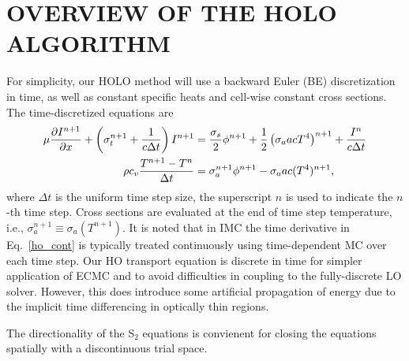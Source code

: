 
\chapter{\uppercase {Overview of the HOLO Algorithm}}
\label{chp:holo}

For simplicity, our HOLO method will use a backward Euler (BE) discretization in time, as
well as constant specific heats and cell-wise constant cross sections. The time-discretized
equations are
\begin{align}
    \mu \frac{\partial I^{n+1}}{\partial x} + \left(\sigma_t^{n+1} + \frac{1}{c \Delta t }\right) I^{n+1}
&= \frac{\sigma_s}{2} \phi^{n+1} +\frac{1}{2} \left(\sigma_a a c T^4 \right)^{n+1} + \frac{I^n}{c \Delta t} \label{eq:trans_td} \\
\rho c_v \frac{T^{n+1} - T^n}{\Delta t} &= \sigma_a^{n+1} \phi^{n+1}
- \sigma_a a c (T^4)^{n+1} \label{eq:mat_td},
\end{align}
where $\Delta t$ is the uniform time step size, the superscript $n$ is used to indicate
the $n$-th time step. Cross sections are evaluated at the end of time step
temperature, i.e., $\sigma_a^{n+1}\equiv\sigma_a(T^{n+1})$. It is noted that in IMC the time derivative in
Eq.~\eqref{ho_cont} is typically treated continuously using time-dependent MC over each
time step.  Our HO transport equation is
discrete in time for simpler application of ECMC and to avoid difficulties in coupling to the
fully-discrete LO solver.  However, this does introduce some artificial propagation of
energy due to the implicit time differencing in optically thin regions. 

The directionality of the S$_2$ equations is convienent for closing the equations
spatially with a discontinuous trial space.

